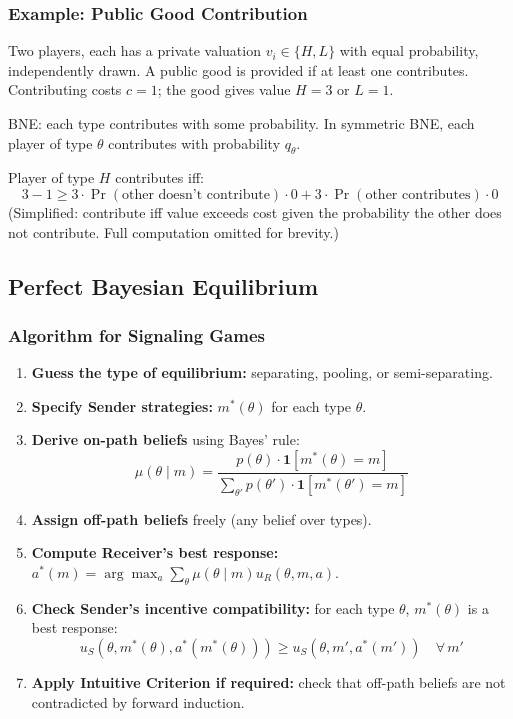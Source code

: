 \documentclass[hidelinks]{article}
\begin{document}
\subsubsection{Example: Public Good Contribution}

Two players, each has a private valuation $v_i \in \{H, L\}$ with equal probability, independently drawn. A public good is provided if at least one contributes. Contributing costs $c = 1$; the good gives value $H = 3$ or $L = 1$.

BNE: each type contributes with some probability. In symmetric BNE, each player of type $\theta$ contributes with probability $q_\theta$.

Player of type $H$ contributes iff:
\[
3 - 1 \geq 3 \cdot \Pr(\text{other doesn't contribute}) \cdot 0 + 3 \cdot \Pr(\text{other contributes}) \cdot 0
\]
(Simplified: contribute iff value exceeds cost given the probability the other does not contribute. Full computation omitted for brevity.)

\subsection{Perfect Bayesian Equilibrium}

\subsubsection{Algorithm for Signaling Games}

\begin{enumerate}
    \item \textbf{Guess the type of equilibrium:} separating, pooling, or semi-separating.
    \item \textbf{Specify Sender strategies:} $m^*(\theta)$ for each type $\theta$.
    \item \textbf{Derive on-path beliefs} using Bayes' rule:
    \[
    \mu(\theta \mid m) = \frac{p(\theta) \cdot \mathbf{1}[m^*(\theta) = m]}{\sum_{\theta'} p(\theta') \cdot \mathbf{1}[m^*(\theta') = m]}
    \]
    \item \textbf{Assign off-path beliefs} freely (any belief over types).
    \item \textbf{Compute Receiver's best response:} $a^*(m) = \arg\max_a \sum_\theta \mu(\theta \mid m) u_R(\theta, m, a)$.
    \item \textbf{Check Sender's incentive compatibility:} for each type $\theta$, $m^*(\theta)$ is a best response:
    \[
    u_S(\theta, m^*(\theta), a^*(m^*(\theta))) \geq u_S(\theta, m', a^*(m')) \quad \forall\, m'
    \]
    \item \textbf{Apply Intuitive Criterion if required:} check that off-path beliefs are not contradicted by forward induction.
\end{enumerate}
\end{document}
